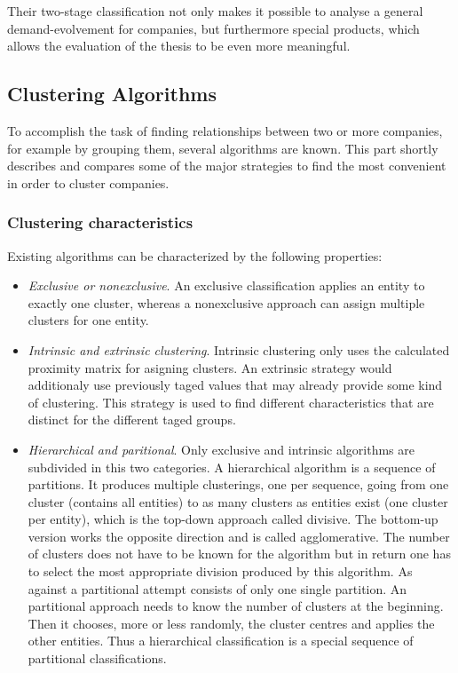 Their two-stage classification not only makes it possible to analyse a general demand-evolvement for companies,
but furthermore special products, which allows the evaluation of the thesis to be even more meaningful.

\subsection{Clustering Algorithms}
To accomplish the task of finding relationships between two or more companies, for example by grouping them, several
algorithms are known. This part shortly describes and compares some of the major strategies to find the most convenient
in order to cluster companies.

\subsubsection{Clustering characteristics}
Existing algorithms can be characterized by the following properties: \cite{jain+dubes}
\begin{itemize}
  \item \emph{Exclusive or nonexclusive}. An exclusive
 classification applies an entity to exactly one cluster, whereas a nonexclusive approach can assign multiple clusters
 for one entity.
  \item \emph{Intrinsic and extrinsic clustering}. Intrinsic clustering only
uses the calculated proximity matrix for asigning clusters. An extrinsic strategy would additionaly use previously
taged values that may already provide some kind of clustering. This strategy is used to find different characteristics
that are distinct for the different taged groups.
  \item \emph{Hierarchical and paritional}. Only exclusive and intrinsic algorithms are subdivided in this two categories.
  A hierarchical algorithm is a sequence of partitions. It produces multiple clusterings, one per sequence, going from
  one cluster (contains all entities) to as many clusters as entities exist (one cluster per entity), which is the top-down
  approach called divisive. The bottom-up version works the opposite direction and is called agglomerative. The number of
  clusters does not have to be known for the algorithm but in return one has to select the most appropriate division
  produced by this algorithm.
  As against a partitional attempt consists of only one single partition. An partitional approach needs to know the number
  of clusters at the beginning. Then it chooses, more or less randomly, the cluster centres and applies the other entities.
  Thus a hierarchical classification is a special sequence of partitional classifications.

\end{itemize}

